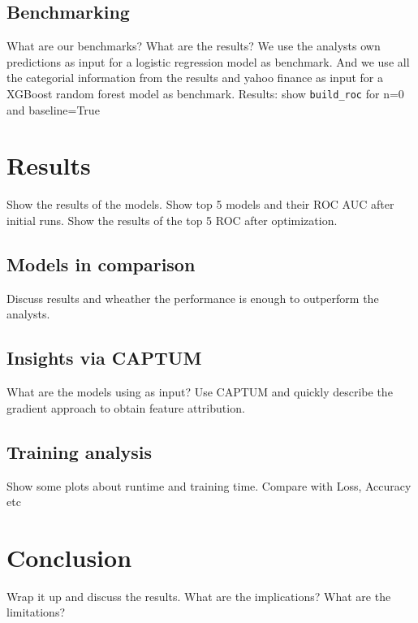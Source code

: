 \documentclass[conference]{IEEEtran}
\begin{document}
\subsection{Benchmarking}
What are our benchmarks? What are the results?
We use the analysts own predictions as input for a logistic regression model as benchmark.
And we use all the categorial information from the results and yahoo finance as input for a XGBoost random forest model as benchmark.
Results: show \texttt{build\_roc} for n=0 and baseline=True

\section{Results}
Show the results of the models.  Show top 5 models and their ROC AUC after initial runs.
Show the results of the top 5 ROC after optimization.
\subsection{Models in comparison}
Discuss results and wheather the performance is enough to outperform the analysts.
\subsection{Insights via CAPTUM}
What are the models using as input? Use CAPTUM and quickly describe the gradient approach to obtain feature attribution.
\subsection{Training analysis}
Show some plots about runtime and training time. Compare with Loss, Accuracy etc

\section{Conclusion}
Wrap it up and discuss the results. What are the implications? What are the limitations?


\end{document}

